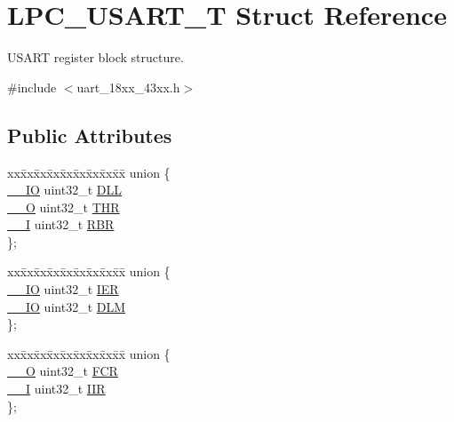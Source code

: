 \hypertarget{struct_l_p_c___u_s_a_r_t___t}{}\section{L\+P\+C\+\_\+\+U\+S\+A\+R\+T\+\_\+T Struct Reference}
\label{struct_l_p_c___u_s_a_r_t___t}


U\+S\+A\+RT register block structure.  




{\ttfamily \#include $<$uart\+\_\+18xx\+\_\+43xx.\+h$>$}

\subsection*{Public Attributes}
\begin{DoxyCompactItemize}
\item 
\begin{tabbing}
xx\=xx\=xx\=xx\=xx\=xx\=xx\=xx\=xx\=\kill
union \{\\
\>\hyperlink{core__sc300_8h_aec43007d9998a0a0e01faede4133d6be}{\_\_IO} uint32\_t \hyperlink{struct_l_p_c___u_s_a_r_t___t_ac2e91646e820b1527747154d82778e48}{DLL}\\
\>\hyperlink{core__sc300_8h_a7e25d9380f9ef903923964322e71f2f6}{\_\_O} uint32\_t \hyperlink{struct_l_p_c___u_s_a_r_t___t_ae93392fb8e6c40f5b340ec0cf145ee1b}{THR}\\
\>\hyperlink{core__sc300_8h_af63697ed9952cc71e1225efe205f6cd3}{\_\_I} uint32\_t \hyperlink{struct_l_p_c___u_s_a_r_t___t_a39191d418ae7de55f62202f25fd29083}{RBR}\\
\}; \\

\end{tabbing}\item 
\begin{tabbing}
xx\=xx\=xx\=xx\=xx\=xx\=xx\=xx\=xx\=\kill
union \{\\
\>\hyperlink{core__sc300_8h_aec43007d9998a0a0e01faede4133d6be}{\_\_IO} uint32\_t \hyperlink{struct_l_p_c___u_s_a_r_t___t_a832413236bebfb6e6495c1055b9a85ae}{IER}\\
\>\hyperlink{core__sc300_8h_aec43007d9998a0a0e01faede4133d6be}{\_\_IO} uint32\_t \hyperlink{struct_l_p_c___u_s_a_r_t___t_a3e9b4b467fbbf43e57e261fd826e5e97}{DLM}\\
\}; \\

\end{tabbing}\item 
\begin{tabbing}
xx\=xx\=xx\=xx\=xx\=xx\=xx\=xx\=xx\=\kill
union \{\\
\>\hyperlink{core__sc300_8h_a7e25d9380f9ef903923964322e71f2f6}{\_\_O} uint32\_t \hyperlink{struct_l_p_c___u_s_a_r_t___t_a01d439a681b9a7a486ad75c91a2f91c8}{FCR}\\
\>\hyperlink{core__sc300_8h_af63697ed9952cc71e1225efe205f6cd3}{\_\_I} uint32\_t \hyperlink{struct_l_p_c___u_s_a_r_t___t_a470cdb18abc446a9768f404314c4a556}{IIR}\\
\}; \\


\end{tabbing}
\end{DoxyCompactItemize}
